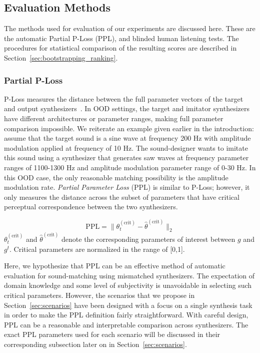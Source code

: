 \documentclass{article}
\begin{document}
\subsection{Evaluation Methods}
\label{subsec:evaluation}
The methods used for evaluation of our experiments are discussed here. These are the automatic Partial P-Loss (PPL), and blinded human listening tests. The procedures for statistical comparison of the resulting scores are described in Section~\ref{sec:bootstrapping_ranking}.


\subsubsection{Partial P-Loss}
\label{sec:partial_ploss}
 P-Loss measures the distance between the full parameter vectors of the target and output synthesizers~\cite{yee2018automatic}. In OOD settings, the target and imitator synthesizers have different architectures or parameter ranges, making full parameter comparison impossible. We reiterate an example given earlier in the introduction: assume that the target sound is a sine wave at frequency 200 Hz with amplitude modulation applied at frequency of 10 Hz. The sound-designer wants to imitate this sound using a synthesizer that generates saw waves at frequency parameter ranges of 1100-1300 Hz and amplitude modulation parameter range of 0-30 Hz. In this OOD case, the only reasonable matching possibility is the amplitude modulation rate. \textit{Partial Parameter Loss} (PPL) is similar to P-Loss; however, it only measures the distance across the subset of parameters that have critical perceptual correspondence between the two synthesizers.

\begin{equation}
\mathrm{PPL} = \| \theta^{(\mathrm{crit})}_t - \hat{\theta}^{(\mathrm{crit})} \|_2
\end{equation}
$\theta^{(\mathrm{crit})}_t$ and $\hat{\theta}^{(\mathrm{crit})}$ denote the corresponding parameters of interest between $g$ and $g^t$.  Critical parameters are normalized in the range of [0,1].

 Here, we hypothesize that PPL can be an effective method of automatic evaluation for sound-matching using mismatched synthesizers. The expectation of domain knowledge and some level of subjectivity is unavoidable in selecting such critical parameters. However, the scenarios that we propose in Section~\ref{sec:scenarios} have been designed with a focus on a single synthesis task in order to make the PPL definition fairly straightforward. With careful design, PPL can be a reasonable and interpretable comparison across synthesizers. The exact PPL parameters used for each scenario will be discussed in their corresponding subsection later on in Section~\ref{sec:scenarios}.
\end{document}
